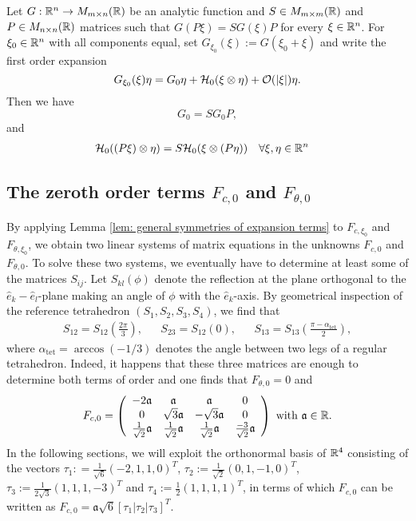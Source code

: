 \begin{lemma}
\label{lem: general symmetries of expansion terms}
Let $G: \mathbb{R}^n \to M_{m \times n}(\mathbb{R})$ be an analytic function and $S \in M_{m \times m}(\mathbb{R})$ and $P \in M_{n \times n}(\mathbb{R})$ matrices such that $G(P \xi) = S G(\xi) P$ for every $\xi \in \mathbb{R}^n$. For $\xi_0 \in \mathbb{R}^n$ with all components equal, set $G_{\xi_0}(\xi) := G(\xi_0 + \xi)$ and write the first order expansion
\begin{equation}
	G_{\xi_0}(\xi)\eta = G_0 \eta + \mathcal{H}_0(\xi \otimes \eta) + \mathcal{O}(|\xi|)\eta.
\end{equation}
Then we have
\begin{equation}
	G_0 = S G_0 P,
\end{equation}
and
\begin{align}
	&\mathcal{H}_0((P \xi) \otimes \eta) = S \mathcal{H}_0(\xi \otimes (P \eta)) &  & \forall \xi, \eta \in \mathbb{R}^n
\end{align}
\end{lemma}

\subsection{The zeroth order terms $F_{c,0}$ and $F_{\theta, 0}$} By applying Lemma \ref{lem: general symmetries of expansion terms} to $F_{c, \xi_0}$ and $F_{\theta, \xi_0}$, we obtain two linear systems of matrix equations in the unknowns $F_{c, 0}$ and $F_{\theta,0}$. To solve these two systems, we eventually have to determine at least some of the matrices $S_{ij}$. Let $S_{kl}(\phi)$ denote the reflection at the plane orthogonal to the $\hat{e}_k-\hat{e}_l$-plane making an angle of $\phi$ with the $\hat{e}_k$-axis. By geometrical inspection of the reference tetrahedron $(S_1, S_2, S_3, S_4)$, we find that
\begin{align}
	S_{12} = S_{12}\left (\tfrac{2\pi}{3}\right ),& & S_{23} = S_{12}(0), & & S_{13} = S_{13}\left (\tfrac{\pi - \alpha_{\mathrm{tet}}}{2}\right ),
\end{align}
where $\alpha_{\mathrm{tet}} = \arccos (-1/3)$ denotes the angle between two legs of a regular tetrahedron. Indeed, it happens that these three matrices are enough to determine both terms of order and one finds that $F_{\theta, 0} = 0$ and
\begin{equation}
	F_{c, 0}  = \left ( \begin{array}{cccc}
	- 2 \mathfrak{a}  & \mathfrak{a}  & \mathfrak{a}  & 0 \\ 
	0 & \sqrt{3}\mathfrak{a}  & -\sqrt{3}\mathfrak{a}  & 0 \\ 
	 \tfrac{1}{\sqrt{2}}\mathfrak{a} & \tfrac{1}{\sqrt{2}}\mathfrak{a} & \tfrac{1}{\sqrt{2}} \mathfrak{a}  & \tfrac{-3}{\sqrt{2}}\mathfrak{a} 
	\end{array} \right ) \text{ with } \mathfrak{a} \in \mathbb{R}.
\end{equation}
In the following sections, we will exploit the orthonormal basis of $\mathbb{R}^4$ consisting of the vectors $\tau_1 : = \tfrac{1}{\sqrt{6}}(-2,1,1,0)^T$, $\tau_2 := \tfrac{1}{\sqrt{2}}(0,1,-1,0)^T$, $\tau_{3}:= \tfrac{1}{2 \sqrt{3}} (1,1,1,-3)^T$ and $\tau_4:= \tfrac{1}{2}(1,1,1,1)^T$, in terms of which $F_{c,0}$ can be written as $F_{c, 0} = \mathfrak{a} \sqrt{6} [\tau_1|\tau_2| \tau_3 ]^T$.


